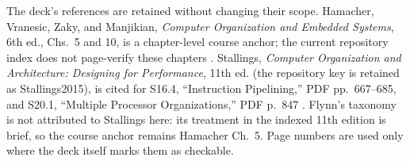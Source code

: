 \documentclass[11pt]{article}
\begin{document}
The deck's references are retained without changing their scope. Hamacher,
Vranesic, Zaky, and Manjikian, \emph{Computer Organization and Embedded
Systems}, 6th ed., Chs.~5 and 10, is a chapter-level course anchor; the
current repository index does not page-verify these chapters
\cite{Hamacher2002_computer_organization}. Stallings, \emph{Computer
Organization and Architecture: Designing for Performance}, 11th ed. (the
repository key is retained as Stallings2015), is cited for S16.4,
``Instruction Pipelining,'' PDF pp.~667--685, and S20.1, ``Multiple Processor
Organizations,'' PDF p.~847 \cite{Stallings2015_computer_organization}.
Flynn's taxonomy is not attributed to Stallings here: its treatment in the
indexed 11th edition is brief, so the course anchor remains Hamacher Ch.~5.
Page numbers are used only where the deck itself marks them as checkable.

\begingroup
\raggedright


\endgroup
\end{document}
